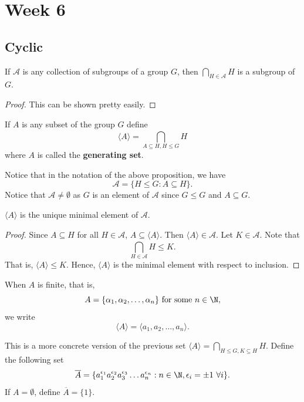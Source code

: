 \section{Week 6}

\subsection{Cyclic}

\begin{prop}[8]
    If \( \mathcal{A} \) is any collection of subgroups of a group \( G  \), then \( \bigcap_{ H \in \mathcal{A} }^{  }  H  \) is a subgroup of \( G  \). 
\end{prop}
\begin{proof}
This can be shown pretty easily.
\end{proof}

\begin{definition}
    If \( A  \) is any subset of the group \( G  \) define
    \[  \langle A  \rangle = \bigcap_{  A \subseteq  H , H \leq G   }^{  }  H \]
    where \( A  \) is called the \textbf{generating set}.
\end{definition}

Notice that in the notation of the above proposition, we have 
\[  \mathcal{A} = \{ H \leq G : A \subseteq  H  \}.  \]
Notice that \( \mathcal{A} \neq \emptyset \) as \( G  \) is an element of \( \mathcal{A} \) since \( G \leq G  \) and \( A \subseteq  G  \).  

\begin{prop}[ ]
    \( \langle A \rangle \) is the unique minimal element of \( \mathcal{A} \).
\end{prop}
\begin{proof}
    Since \( A \subseteq H   \) for all \( H \in \mathcal{A} \), \( A \subseteq  \langle A  \rangle \). Then \( \langle A  \rangle \in \mathcal{A} \). Let \( K \in \mathcal{A} \). Note that 
    \[ \bigcap_{ H \in \mathcal{A} }^{  } H \leq K.  \]
    That is, \( \langle A  \rangle \leq K  \). Hence, \( \langle A  \rangle \) is the minimal element with respect to inclusion. 
\end{proof}

When \( A  \) is finite, that is, 
\[  A = \{  {\alpha}_{1}, {\alpha}_{2}, \dots, {\alpha}_{n} \} \ \text{for some} \ n \in \N,  \]
we write
\[  \langle A   \rangle  = \langle  {a}_{1}, {a}_{2}, \dots, {a}_{n} \rangle. \]

This is a more concrete version of the previous set \( \langle A  \rangle = \bigcap_{  H \leq G , K \subseteq  H  }^{   }  H  \). Define the following set 
\[  \overline{A} = \{  {a}_{1}^{{\epsilon}_{1}}  {a}_{2}^{{\epsilon}_{2}} {a}_{3}^{{\epsilon}_{3}} \dots {a}_{n}^{{\epsilon}_{n}} : n \in \N , {\epsilon}_{i} = \pm 1 \ \forall i \}. \]
If \( A = \emptyset  \), define \( \overline{A} = \{ 1  \}  \).

